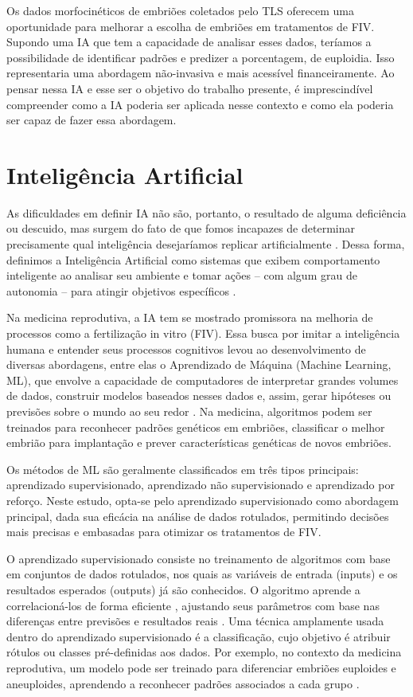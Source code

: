 Os dados morfocinéticos de embriões coletados pelo TLS oferecem uma oportunidade para melhorar a escolha de embriões em tratamentos de FIV. Supondo uma IA que tem a capacidade de analisar esses dados, teríamos a possibilidade de identificar padrões e predizer a porcentagem, de euploidia. Isso representaria uma abordagem não-invasiva e mais acessível financeiramente. Ao pensar nessa IA e esse ser o objetivo do trabalho presente, é imprescindível compreender como a IA poderia ser aplicada nesse contexto e como ela poderia ser capaz de fazer essa abordagem. 

\section{Inteligência Artificial}

As dificuldades em definir IA não são, portanto, o resultado de alguma deficiência ou descuido, mas surgem do fato de que fomos incapazes de determinar precisamente qual inteligência desejaríamos replicar artificialmente \cite{sheikh2023}. Dessa forma, definimos a Inteligência Artificial como sistemas que exibem comportamento inteligente ao analisar seu ambiente e tomar ações {–} com algum grau de autonomia {–} para atingir objetivos específicos \cite{sheikh2023}. 

Na medicina reprodutiva, a IA tem se mostrado promissora na melhoria de processos como a fertilização in vitro (FIV). Essa busca por imitar a inteligência humana e entender seus processos cognitivos levou ao desenvolvimento de diversas abordagens, entre elas o Aprendizado de Máquina (Machine Learning, ML), que envolve a capacidade de computadores de interpretar grandes volumes de dados, construir modelos baseados nesses dados e, assim, gerar hipóteses ou previsões sobre o mundo ao seu redor \cite{russell2016}. Na medicina, algoritmos podem ser treinados para reconhecer padrões genéticos em embriões, classificar o melhor embrião para implantação e prever características genéticas de novos embriões. 

Os métodos de ML são geralmente classificados em três tipos principais: aprendizado supervisionado, aprendizado não supervisionado e aprendizado por reforço. Neste estudo, opta-se pelo aprendizado supervisionado como abordagem principal, dada sua eficácia na análise de dados rotulados, permitindo decisões mais precisas e embasadas para otimizar os tratamentos de FIV.

O aprendizado supervisionado consiste no treinamento de algoritmos com base em conjuntos de dados rotulados, nos quais as variáveis de entrada (inputs) e os resultados esperados (outputs) já são conhecidos. O algoritmo aprende a correlacioná-los de forma eficiente \cite{russell2016}, ajustando seus parâmetros com base nas diferenças entre previsões e resultados reais \cite{trask2019}. Uma técnica amplamente usada dentro do aprendizado supervisionado é a classificação, cujo objetivo é atribuir rótulos ou classes pré-definidas aos dados. Por exemplo, no contexto da medicina reprodutiva, um modelo pode ser treinado para diferenciar embriões euploides e aneuploides, aprendendo a reconhecer padrões associados a cada grupo \cite{izbicki2020}.

